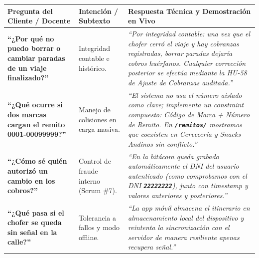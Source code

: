 \documentclass[a4paper,9pt]{article}
\newcommand{\codeb}[1]{\texttt{\bfseries #1}}
\begin{document}
\vspace{-4pt}

\begin{tcolorbox}[cardheader, title={\small ESCUDO TÉCNICO: MANEJO DE PREGUNTAS DIFÍCILES Y OBJECIONES}, top=2.5pt, bottom=2.5pt]
{\scriptsize
\begin{tabularx}{\textwidth}{@{}p{} p{} X@{}}
\textbf{Pregunta del Cliente / Docente} & \textbf{Intención / Subtexto} & \textbf{Respuesta Técnica y Demostración en Vivo} \\
\midrule
\textbf{``¿Por qué no puedo borrar o cambiar paradas de un viaje finalizado?''} & Integridad contable e histórico. & \textit{``Por integridad contable: una vez que el chofer cerró el viaje y hay cobranzas registradas, borrar paradas dejaría cobros huérfanos. Cualquier corrección posterior se efectúa mediante la HU-58 de Ajuste de Cobranzas auditada.''} \\
\midrule
\textbf{``¿Qué ocurre si dos marcas cargan el remito 0001-00099999?''} & Manejo de colisiones en carga masiva. & \textit{``El sistema no usa el número aislado como clave; implementa un constraint compuesto: Código de Marca + Número de Remito. En \codeb{/remitos/} mostramos que coexisten en Cervecería y Snacks Andinos sin conflicto.''} \\
\midrule
\textbf{``¿Cómo sé quién autorizó un cambio en los cobros?''} & Control de fraude interno (Scrum \#7). & \textit{``En la bitácora queda grabado automáticamente el DNI del usuario autenticado (como comprobamos con el DNI \codeb{22222222}), junto con timestamp y valores anteriores y posteriores.''} \\
\midrule
\textbf{``¿Qué pasa si el chofer se queda sin señal en la calle?''} & Tolerancia a fallos y modo offline. & \textit{``La app móvil almacena el itinerario en almacenamiento local del dispositivo y reintenta la sincronización con el servidor de manera resiliente apenas recupera señal.''} \\
\end{tabularx}
}
\end{tcolorbox}
\end{document}
